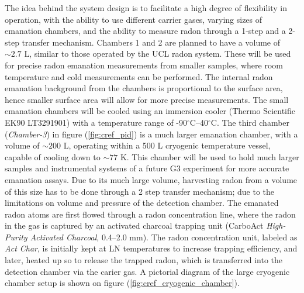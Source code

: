 The idea behind the system design is to facilitate a high degree of flexibility in operation, with the ability to use different carrier gases, varying sizes of emanation chambers, and the ability to measure radon through a 1-step and a 2-step transfer mechanism. Chambers 1 and 2 are planned to have a volume of $\sim2.7$ L, similar to those operated by the UCL radon system. These will be used for precise radon emanation measurements from smaller samples, where room temperature and cold measurements can be performed. The internal radon emanation background from the chambers is proportional to the surface area, hence smaller surface area will allow for more precise measurements. The small emanation chambers will be cooled using an immersion cooler (Thermo Scientific EK90 LT3291901) with a temperature range of -90$^{\circ}$C--40$^{\circ}$C. The third chamber (\textit{Chamber-3}) in figure (\ref{fig:cref_pid}) is a much larger emanation chamber, with a volume of $\sim200$ L, operating within a 500 L cryogenic temperature vessel, capable of cooling down to $\sim77$ K. This chamber will be used to hold much larger samples and instrumental systems of a future G3 experiment for more accurate emanation assays. Due to its much large volume, harvesting radon from a volume of this size has to be done through a 2 step transfer mechanism; due to the limitations on volume and pressure of the detection chamber. The emanated radon atoms are first flowed through a radon concentration line, where the radon in the gas is captured by an activated charcoal trapping unit (CarboAct \textit{High-Purity Activated Charcoal}, 0.4--2.0 mm). The radon concentration unit, labeled as \textit{Act Char}, is initially kept at LN temperatures to increase trapping efficiency, and later, heated up so to release the trapped radon, which is transferred into the detection chamber via the carier gas. A pictorial diagram of the large cryogenic chamber setup is shown on figure (\ref{fig:cref_cryogenic_chamber}).
%
